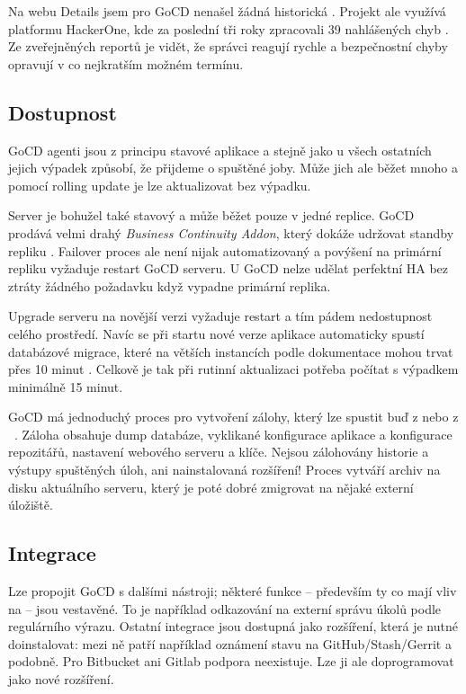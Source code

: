         Na webu  Details jsem pro GoCD nenašel žádná historická . Projekt ale využívá platformu HackerOne, kde za poslední tři roky zpracovali 39 nahlášených chyb \cite{gocd-hackerone}. Ze zveřejněných reportů je vidět, že správci reagují rychle a bezpečnostní chyby opravují v co nejkratším možném termínu.

    \subsection{Dostupnost}
        GoCD agenti jsou z principu stavové aplikace a stejně jako u všech ostatních \CI jejich výpadek způsobí, že přijdeme o spuštěné joby. Může jich ale běžet mnoho a pomocí rolling update je lze aktualizovat bez výpadku.

        Server je bohužel také stavový a může běžet pouze v jedné replice. GoCD prodává velmi drahý \textit{Business Continuity Addon}, který dokáže udržovat standby repliku \cite{gocd-ha}. Failover proces ale není nijak automatizovaný a povýšení na primární repliku vyžaduje restart GoCD serveru. U GoCD nelze udělat perfektní HA bez ztráty žádného požadavku když vypadne primární replika.

        Upgrade serveru na novější verzi vyžaduje restart a tím pádem nedostupnost celého prostředí. Navíc se při startu nové verze aplikace automaticky spustí databázové migrace, které na větších instancích podle dokumentace mohou trvat přes 10 minut \cite{gocd-upgrading}. Celkově je tak při rutinní aktualizaci potřeba počítat s výpadkem minimálně 15 minut.

        GoCD má jednoduchý proces pro vytvoření zálohy, který lze spustit buď z  nebo z ~\cite{gocd-backup}. Záloha obsahuje dump databáze, vyklikané  konfigurace aplikace a konfigurace repozitářů, nastavení webového serveru a klíče. Nejsou zálohovány historie a výstupy spuštěných úloh, ani nainstalovaná rozšíření! Proces vytváří archiv na disku aktuálního serveru, který je poté dobré zmigrovat na nějaké externí úložiště.

    \subsection{Integrace}
        Lze propojit GoCD s dalšími nástroji; některé funkce -- především ty co mají vliv na  -- jsou vestavěné. To je například odkazování na externí správu úkolů podle regulárního výrazu. Ostatní integrace jsou dostupná jako rozšíření, která je nutné doinstalovat: mezi ně patří například oznámení stavu na GitHub/Stash/Gerrit a podobně. Pro Bitbucket ani Gitlab podpora neexistuje. Lze ji ale doprogramovat jako nové rozšíření.

